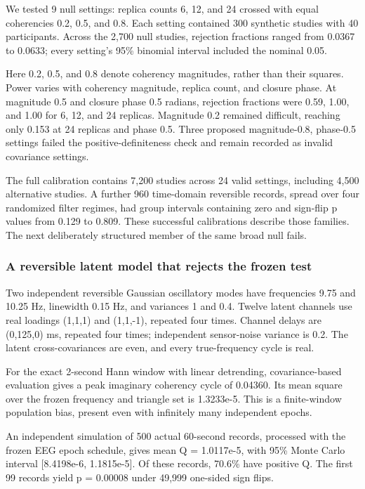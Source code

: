 \documentclass[11pt,a4paper]{article}
\begin{document}
We tested 9 null settings: replica counts 6, 12, and 24 crossed with equal coherencies 0.2, 0.5, and 0.8. Each setting contained 300 synthetic studies with 40 participants. Across the 2,700 null studies, rejection fractions ranged from 0.0367 to 0.0633; every setting's 95\% binomial interval included the nominal 0.05.

Here 0.2, 0.5, and 0.8 denote coherency magnitudes, rather than their squares. Power varies with coherency magnitude, replica count, and closure phase. At magnitude 0.5 and closure phase 0.5 radians, rejection fractions were 0.59, 1.00, and 1.00 for 6, 12, and 24 replicas. Magnitude 0.2 remained difficult, reaching only 0.153 at 24 replicas and phase 0.5. Three proposed magnitude-0.8, phase-0.5 settings failed the positive-definiteness check and remain recorded as invalid covariance settings.

The full calibration contains 7,200 studies across 24 valid settings, including 4,500 alternative studies. A further 960 time-domain reversible records, spread over four randomized filter regimes, had group intervals containing zero and sign-flip p values from 0.129 to 0.809. These successful calibrations describe those families. The next deliberately structured member of the same broad null fails.

\subsubsection{A reversible latent model that rejects the frozen test}

Two independent reversible Gaussian oscillatory modes have frequencies 9.75 and 10.25 Hz, linewidth 0.15 Hz, and variances 1 and 0.4. Twelve latent channels use real loadings (1,1,1) and (1,1,-1), repeated four times. Channel delays are (0,125,0) ms, repeated four times; independent sensor-noise variance is 0.2. The latent cross-covariances are even, and every true-frequency cycle is real.

For the exact 2-second Hann window with linear detrending, covariance-based evaluation gives a peak imaginary coherency cycle of 0.04360. Its mean square over the frozen frequency and triangle set is 1.3233e-5. This is a finite-window population bias, present even with infinitely many independent epochs.

An independent simulation of 500 actual 60-second records, processed with the frozen EEG epoch schedule, gives mean Q = 1.0117e-5, with 95\% Monte Carlo interval {[}8.4198e-6, 1.1815e-5{]}. Of these records, 70.6\% have positive Q. The first 99 records yield p = 0.00008 under 49,999 one-sided sign flips.
\end{document}

